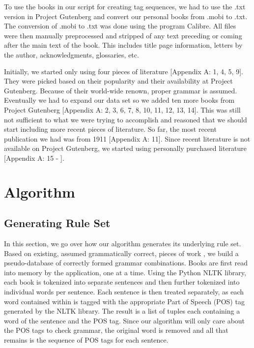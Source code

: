\documentclass[11pt,a4paper]{article}
\begin{document}
\begin{multicols}{2}
To use the books in our script for creating tag sequences, we had to use the .txt version in Project Gutenberg and convert our personal books from .mobi to .txt. The conversion of .mobi to .txt was done using the program Calibre. All files were then manually preprocessed and stripped of any text preceding or coming after the main text of the book. This includes title page information, letters by the author, acknowledgments, glossaries, etc.

Initially, we started only using four pieces of literature [Appendix A: 1, 4, 5, 9]. They were picked based on their popularity and their availability at Project Gutenberg. Because of their world-wide renown, proper grammar is assumed. Eventually we had to expand our data set so we added ten more books from Project Gutenberg [Appendix A: 2, 3, 6, 7, 8, 10, 11, 12, 13, 14]. This was still not sufficient to what we were trying to accomplish and reasoned that we should start including more recent pieces of literature. So far, the most recent publication we had was from 1911 [Appendix A: 11]. Since recent literature is not available on Project Gutenberg, we started using personally purchased literature [Appendix A: 15 - ].


\section{Algorithm}


\subsection{Generating Rule Set}

In this section, we go over how our algorithm generates its underlying rule set. Based on existing, assumed grammatically correct, pieces of work \cite{gutenberg}, we build a pseudo-database of correctly formed grammar combinations. Books are first read into memory by the application, one at a time. Using the Python NLTK library, each book is tokenized into separate sentences and then further tokenized into individual words per sentence. Each sentence is then treated separately, as each word contained within is tagged with the appropriate Part of Speech (POS) tag generated by the NLTK library. The result is a list of tuples each containing a word of the sentence and the POS tag. Since our algorithm will only care about the POS tags to check grammar, the original word is removed and all that remains is the sequence of POS tags for each sentence. 


\end{multicols}
\end{document}
